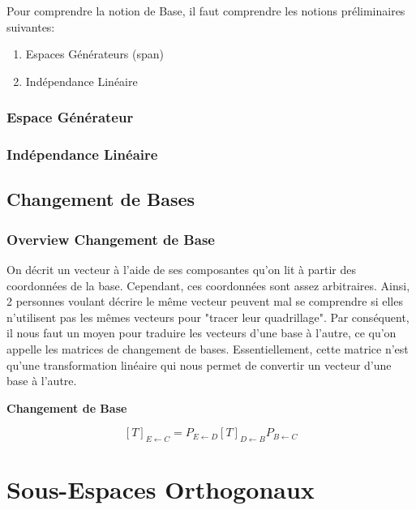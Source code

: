 \documentclass{article}
\begin{document}
Pour comprendre la notion de Base, il faut comprendre les notions préliminaires
suivantes:
\begin{enumerate}
    \item Espaces Générateurs (span)
    \item Indépendance Linéaire
\end{enumerate}

\subsubsection{Espace Générateur}%
\label{ssub:Espace Générateur}

\subsubsection{Indépendance Linéaire}%
\label{ssub:subsubsection name}

\subsection{Changement de Bases}%
\label{sub:Changement de Bases}

\subsubsection{Overview Changement de Base}%
\label{sub:Overview}

On décrit un vecteur à l'aide de ses composantes qu'on lit à partir des
coordonnées de la base. Cependant, ces coordonnées sont assez arbitraires.
Ainsi, 2 personnes voulant décrire le même vecteur peuvent mal se comprendre
si elles n'utilisent pas les mêmes vecteurs pour "tracer leur quadrillage".
Par conséquent, il nous faut un moyen pour traduire les vecteurs d'une base
à l'autre, ce qu'on appelle les matrices de changement de bases. Essentiellement,
cette matrice n'est qu'une transformation linéaire qui nous permet de convertir
un vecteur d'une base à l'autre.

\textbf{Changement de Base}

\begin{theorem}
    $$ [T]_{E \leftarrow C} = P_{E \leftarrow D} [T]_{D \leftarrow B}
    P_{B \leftarrow C} $$
\end{theorem}

\section{Sous-Espaces Orthogonaux}%
\label{sec:Sous-Espaces Orthogonaux}
\end{document}
